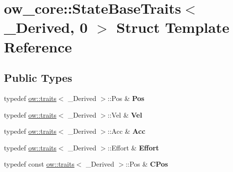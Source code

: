 \hypertarget{structow__core_1_1StateBaseTraits_3_01__Derived_00_010_01_4}{}\section{ow\+\_\+core\+:\+:State\+Base\+Traits$<$ \+\_\+\+Derived, 0 $>$ Struct Template Reference}
\label{structow__core_1_1StateBaseTraits_3_01__Derived_00_010_01_4}
\subsection*{Public Types}
\begin{DoxyCompactItemize}
\item 
typedef \hyperlink{structow_1_1traits}{ow\+::traits}$<$ \+\_\+\+Derived $>$\+::Pos \& {\bfseries Pos}\hypertarget{structow__core_1_1StateBaseTraits_3_01__Derived_00_010_01_4_a34e3ba77f3b4519aed2bdd231331dad5}{}\label{structow__core_1_1StateBaseTraits_3_01__Derived_00_010_01_4_a34e3ba77f3b4519aed2bdd231331dad5}

\item 
typedef \hyperlink{structow_1_1traits}{ow\+::traits}$<$ \+\_\+\+Derived $>$\+::Vel \& {\bfseries Vel}\hypertarget{structow__core_1_1StateBaseTraits_3_01__Derived_00_010_01_4_a2461569cebd2192484aef07e0734b483}{}\label{structow__core_1_1StateBaseTraits_3_01__Derived_00_010_01_4_a2461569cebd2192484aef07e0734b483}

\item 
typedef \hyperlink{structow_1_1traits}{ow\+::traits}$<$ \+\_\+\+Derived $>$\+::Acc \& {\bfseries Acc}\hypertarget{structow__core_1_1StateBaseTraits_3_01__Derived_00_010_01_4_a3e7dd067916b156cae2b4944d8381c67}{}\label{structow__core_1_1StateBaseTraits_3_01__Derived_00_010_01_4_a3e7dd067916b156cae2b4944d8381c67}

\item 
typedef \hyperlink{structow_1_1traits}{ow\+::traits}$<$ \+\_\+\+Derived $>$\+::Effort \& {\bfseries Effort}\hypertarget{structow__core_1_1StateBaseTraits_3_01__Derived_00_010_01_4_a2ffa87839afc70b747c7814933729f05}{}\label{structow__core_1_1StateBaseTraits_3_01__Derived_00_010_01_4_a2ffa87839afc70b747c7814933729f05}

\item 
typedef const \hyperlink{structow_1_1traits}{ow\+::traits}$<$ \+\_\+\+Derived $>$\+::Pos \& {\bfseries C\+Pos}\hypertarget{structow__core_1_1StateBaseTraits_3_01__Derived_00_010_01_4_ab6de8df67a37f062a6f547c58f279b6f}{}\label{structow__core_1_1StateBaseTraits_3_01__Derived_00_010_01_4_ab6de8df67a37f062a6f547c58f279b6f}


\end{DoxyCompactItemize}
